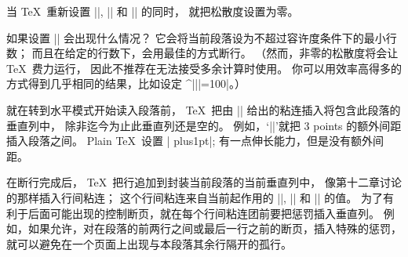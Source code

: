 \ddanger 当 \TeX\ 重新设置 |\hangindent|, |\hangafter| 和 |\parshape| 的同时，
就把松散度设置为零。

\ddangerexercise 如果设置 || 会出现什么情况？
\answer 它会将当前段落设为不超过容许度条件下的最小行数；
而且在给定的行数下，会用最佳的方式断行。%
（然而，非零的松散度将会让 \TeX\ 费力运行，
因此不推荐在无法接受多余计算时使用。
你可以用效率高得多的方式得到几乎相同的结果，比如设定 ^|\linepenalty||=100|。）

\danger 就在转到水平模式开始读入段落前，
 \TeX\ 把由 |\parskip| 给出的粘连插入将包含此段落的垂直列\hbox{中，}
除非迄今为止此垂直列还是空的。%
例如，`|\parskip=3pt|'就把 3 points 的额外间距插入段落之间。%
Plain \TeX\ 设置 |\parskip=0pt plus1pt|; 有一点伸长能力，但是没有额外间距。

\danger 在断行完成后， \TeX\ 把行追加到封装当前段落的当前垂直列中，
像第十二章讨论的那样插入行间粘连；
这个行间粘连来自当前起作用的 |\baselineskip|, |\lineskip| 和 |\lineskiplimit| 的值。%
为了有利于后面可能出现的控制断页，就在每个行间粘连团前要把惩罚插入垂直列。%
例如，如果允许，对在段落的前两行之间或最后一行之前的断页，插入特殊的惩罚，
就可以避免在一个页面上出现与本段落其余行隔开的孤行。

